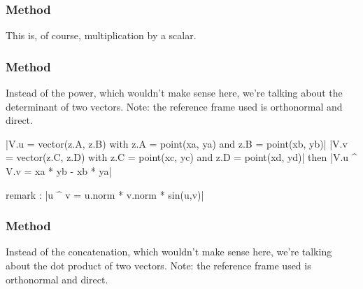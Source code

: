 \subsubsection{Method }
\label{ssub:method_vector_mul}
This is, of course, multiplication by a scalar.

\begin{minipage}{.5\textwidth}


\end{minipage}
\begin{minipage}{.5\textwidth}
\begin{tkzexample}
\end{tkzexample}
\end{minipage}

\subsubsection{Method }
\label{ssub:method_vector_det}
Instead of the power, which wouldn't make sense here, we're talking about the determinant of two vectors. Note: the reference frame used is orthonormal and direct.

\begin{mybox}
|V.u = vector(z.A, z.B) with z.A = point(xa, ya) and z.B = point(xb, yb)|
|V.v = vector(z.C, z.D) with z.C = point(xc, yc) and z.D = point(xd, yd)|
then |V.u ^ V.v = xa * yb -  xb * ya|
\end{mybox}

remark : |u ^ v = u.norm * v.norm * sin(u,v)|

\subsubsection{Method }
\label{ssub:method_vector_dot}
Instead of the concatenation, which wouldn't make sense here, we're talking about the dot product of two vectors. Note: the reference frame used is orthonormal and direct.

